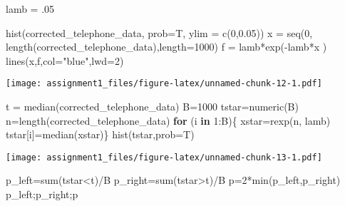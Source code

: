 \documentclass[
]{article}
\newenvironment{Shaded}{\begin{snugshade}}{\end{snugshade}}
\newcommand{\AttributeTok}[1]{\textcolor[rgb]{0.77,0.63,0.00}{#1}}
\newcommand{\ControlFlowTok}[1]{\textcolor[rgb]{0.13,0.29,0.53}{\textbf{#1}}}
\newcommand{\DecValTok}[1]{\textcolor[rgb]{0.00,0.00,0.81}{#1}}
\newcommand{\FloatTok}[1]{\textcolor[rgb]{0.00,0.00,0.81}{#1}}
\newcommand{\FunctionTok}[1]{\textcolor[rgb]{0.00,0.00,0.00}{#1}}
\newcommand{\NormalTok}[1]{#1}
\newcommand{\OtherTok}[1]{\textcolor[rgb]{0.56,0.35,0.01}{#1}}
\newcommand{\SpecialCharTok}[1]{\textcolor[rgb]{0.00,0.00,0.00}{#1}}
\newcommand{\StringTok}[1]{\textcolor[rgb]{0.31,0.60,0.02}{#1}}
\begin{document}
\begin{Shaded}
\begin{Highlighting}[]
\NormalTok{lamb }\OtherTok{=}\NormalTok{ .}\DecValTok{05}

\FunctionTok{hist}\NormalTok{(corrected\_telephone\_data, }\AttributeTok{prob=}\NormalTok{T, }\AttributeTok{ylim =} \FunctionTok{c}\NormalTok{(}\DecValTok{0}\NormalTok{,}\FloatTok{0.05}\NormalTok{))}
\NormalTok{x }\OtherTok{=} \FunctionTok{seq}\NormalTok{(}\DecValTok{0}\NormalTok{, }\FunctionTok{length}\NormalTok{(corrected\_telephone\_data),}\AttributeTok{length=}\DecValTok{1000}\NormalTok{)}
\NormalTok{f }\OtherTok{=}\NormalTok{ lamb}\SpecialCharTok{*}\FunctionTok{exp}\NormalTok{(}\SpecialCharTok{{-}}\NormalTok{lamb}\SpecialCharTok{*}\NormalTok{x )}
\FunctionTok{lines}\NormalTok{(x,f,}\AttributeTok{col=}\StringTok{"blue"}\NormalTok{,}\AttributeTok{lwd=}\DecValTok{2}\NormalTok{)}
\end{Highlighting}
\end{Shaded}

\texttt{[image: assignment1\_files/figure-latex/unnamed-chunk-12-1.pdf]}

\begin{Shaded}
\begin{Highlighting}[]
\NormalTok{t }\OtherTok{=} \FunctionTok{median}\NormalTok{(corrected\_telephone\_data)}
\NormalTok{B}\OtherTok{=}\DecValTok{1000}
\NormalTok{tstar}\OtherTok{=}\FunctionTok{numeric}\NormalTok{(B)}
\NormalTok{n}\OtherTok{=}\FunctionTok{length}\NormalTok{(corrected\_telephone\_data)}
\ControlFlowTok{for}\NormalTok{ (i }\ControlFlowTok{in} \DecValTok{1}\SpecialCharTok{:}\NormalTok{B)\{}
\NormalTok{  xstar}\OtherTok{=}\FunctionTok{rexp}\NormalTok{(n, lamb)}
\NormalTok{  tstar[i]}\OtherTok{=}\FunctionTok{median}\NormalTok{(xstar)\}}
  \FunctionTok{hist}\NormalTok{(tstar,}\AttributeTok{prob=}\NormalTok{T)}
\end{Highlighting}
\end{Shaded}

\texttt{[image: assignment1\_files/figure-latex/unnamed-chunk-13-1.pdf]}

\begin{Shaded}
\begin{Highlighting}[]
\NormalTok{p\_left}\OtherTok{=}\FunctionTok{sum}\NormalTok{(tstar}\SpecialCharTok{\textless{}}\NormalTok{t)}\SpecialCharTok{/}\NormalTok{B}
\NormalTok{p\_right}\OtherTok{=}\FunctionTok{sum}\NormalTok{(tstar}\SpecialCharTok{\textgreater{}}\NormalTok{t)}\SpecialCharTok{/}\NormalTok{B}
\NormalTok{p}\OtherTok{=}\DecValTok{2}\SpecialCharTok{*}\FunctionTok{min}\NormalTok{(p\_left,p\_right)}
\NormalTok{p\_left;p\_right;p}
\end{Highlighting}
\end{Shaded}
\end{document}
